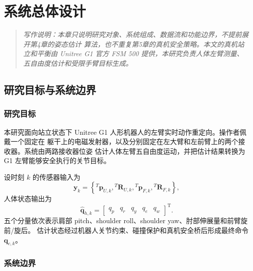 
\chapter{系统总体设计}
\label{chap:system_design_modeling}

\begin{quote}
\itshape
写作说明：本章只说明研究对象、系统组成、数据流和功能边界，不提前展开第4章的姿态估计
算法，也不重复第5章的真机安全策略。本文的真机站立和平衡由 Unitree G1 官方 FSM 500
提供，本研究负责人体左臂测量、五自由度估计和受限手臂目标生成。
\end{quote}

\section{研究目标与系统边界}
\label{sec:ch3_objectives}

\subsection{研究目标}
\label{subsec:ch3_research_goal}

本研究面向站立状态下 Unitree G1 人形机器人的左臂实时动作重定向。操作者佩戴一个固定在
躯干上的电磁发射器，以及分别固定在左大臂和左前臂上的两个接收器。系统由两路接收器位姿
估计人体左臂五自由度运动，并把估计结果转换为 G1 左臂能够安全执行的关节目标。

设时刻 $k$ 的传感器输入为
\begin{equation}
  \boldsymbol y_k=
  \left\{{}^{T}\boldsymbol p_{U,k},{}^{T}\boldsymbol R_{U,k},
  {}^{T}\boldsymbol p_{F,k},{}^{T}\boldsymbol R_{F,k}\right\},
  \label{eq:ch3_sensor_input}
\end{equation}
人体状态输出为
\begin{equation}
  \hat{\boldsymbol q}_{h,k}=
  \begin{bmatrix}q_p&q_r&q_y&q_e&q_w\end{bmatrix}^{\mathrm T}.
  \label{eq:ch3_human_output}
\end{equation}
五个分量依次表示肩部 pitch、shoulder roll、shoulder yaw、肘部伸展量和前臂旋前/旋后。
估计状态经过机器人关节约束、碰撞保护和真机安全桥后形成最终命令
$\boldsymbol q_{c,k}$。

\subsection{系统边界}
\label{subsec:ch3_scope}


